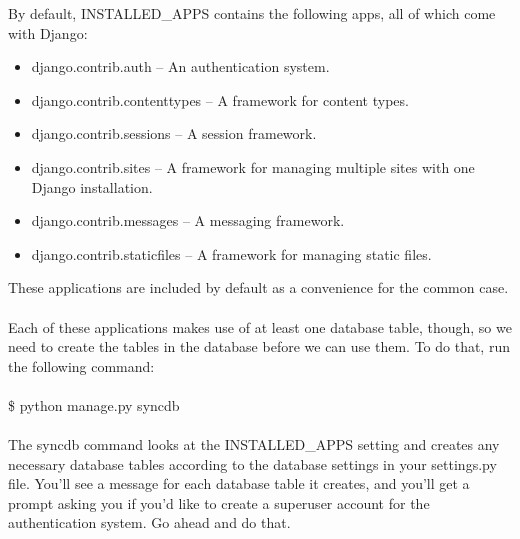 By default, INSTALLED\_APPS contains the following apps, all of which 
come with Django:\\
\begin{itemize}
\item django.contrib.auth -- An authentication system.
\item django.contrib.contenttypes -- A framework for content types.
\item django.contrib.sessions -- A session framework.
\item django.contrib.sites -- A framework for managing multiple sites 
with one Django installation.
\item django.contrib.messages -- A messaging framework.
\item django.contrib.staticfiles -- A framework for managing static 
files.
\end{itemize}
These applications are included by default as a convenience for the 
common case.\\\\
Each of these applications makes use of at least one database table, 
though, so we need to create the tables in the database before we can 
use them. To do that, run the following command:\\\\
\$ python manage.py syncdb\\\\
The syncdb command looks at the INSTALLED\_APPS setting and creates 
any necessary database tables according to the database settings in 
your settings.py file. You'll see a message for each database table it 
creates, and you'll get a prompt asking you if you'd like to create a 
superuser account for the authentication system. Go ahead and do that.
